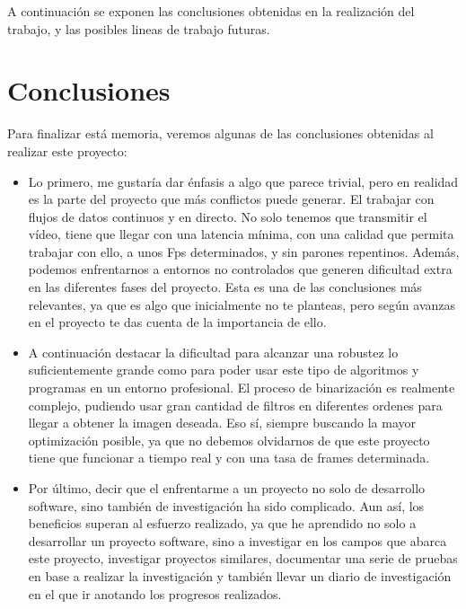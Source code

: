 A continuación se exponen las conclusiones obtenidas en la realización del trabajo, y las posibles lineas de trabajo futuras. 

\section{Conclusiones}
Para finalizar está memoria, veremos algunas de las conclusiones obtenidas al realizar este proyecto:

\begin{itemize}
	\item Lo primero, me gustaría dar énfasis a algo que parece trivial, pero en realidad es la parte del proyecto que más conflictos puede generar. El trabajar con flujos de datos continuos y en directo. No solo tenemos que transmitir el vídeo, tiene que llegar con una latencia mínima, con una calidad que permita trabajar con ello, a unos Fps determinados, y sin parones repentinos. Además, podemos enfrentarnos a entornos no controlados que generen dificultad extra en las diferentes fases del proyecto. Esta es una de las conclusiones más relevantes, ya que es algo que inicialmente no te planteas, pero según avanzas en el proyecto te das cuenta de la importancia de ello.
	
	\item A continuación destacar la dificultad para alcanzar una robustez lo suficientemente grande como para poder usar este tipo de algoritmos y programas en un entorno profesional. El proceso de binarización es realmente complejo, pudiendo usar gran cantidad de filtros en diferentes ordenes para llegar a obtener la imagen deseada. Eso sí, siempre buscando la mayor optimización posible, ya que no debemos olvidarnos de que este proyecto tiene que funcionar a tiempo real y con una tasa de frames determinada.
	
	\item Por último, decir que el enfrentarme a un proyecto no solo de desarrollo software, sino también de investigación ha sido complicado. Aun así, los beneficios superan al esfuerzo realizado, ya que he aprendido no solo a desarrollar un proyecto software, sino a investigar en los campos que abarca este proyecto, investigar proyectos similares, documentar una serie de pruebas en base a realizar la investigación y también llevar un diario de investigación en el que ir anotando los progresos realizados.
	
\end{itemize}

